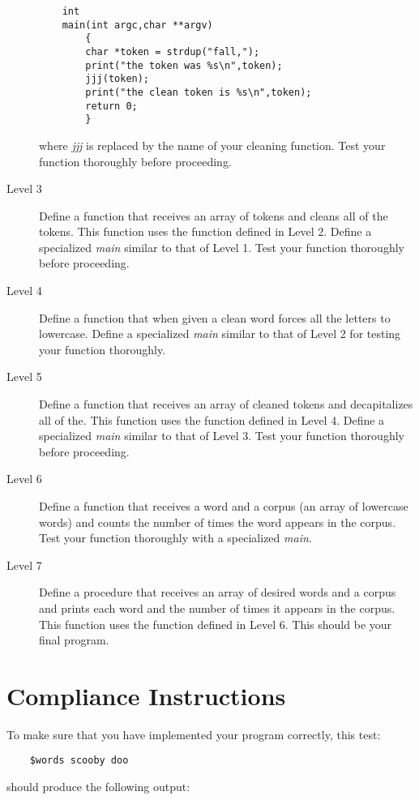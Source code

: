 \documentclass[12pt]{article}
\begin{document}
\begin{description}
\begin{verbatim}
    int
    main(int argc,char **argv)
        {
        char *token = strdup("fall,");
        print("the token was %s\n",token);
        jjj(token);
        print("the clean token is %s\n",token);
        return 0;
        }
\end{verbatim}

where {\it jjj} is replaced by the name of your cleaning function.
Test your function thoroughly before proceeding.

\item[Level 3]
Define a function that receives an array of tokens and cleans
all of the tokens.
This function uses the function
defined in Level 2.
Define a specialized {\it main} similar to that of Level 1.
Test your function thoroughly before proceeding.
\item[Level 4]
Define a function that when given a clean word forces all the
letters to lowercase.
Define a specialized {\it main} similar to that of Level 2 for
testing
your function thoroughly.
\item[Level 5]
Define a function that receives an array of cleaned tokens and decapitalizes
all of the.
This function uses the function
defined in Level 4.
Define a specialized {\it main} similar to that of Level 3.
Test your function thoroughly before proceeding.
\item[Level 6]
Define a function that receives a word and
a corpus (an array of lowercase words) and counts the number of
times the word appears in the corpus.
Test your function thoroughly with a specialized {\it main}.
\item[Level 7]
Define a procedure that receives an array of desired words
and a corpus
and prints each word and the number of times it appears in the
corpus. This function uses the function defined in Level 6.
This should be your final program.
\end{description}

\section*{Compliance Instructions}

To make sure that you have implemented your
program correctly,  this test:

\begin{verbatim}
    $words scooby doo
\end{verbatim}

should produce the following output:
\end{document}
